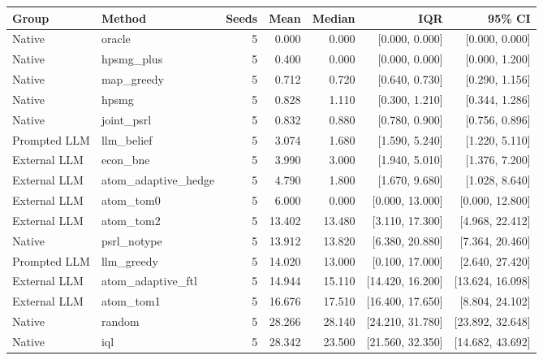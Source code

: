 \begin{tabular}{llrrrrr}
\toprule
Group & Method & Seeds & Mean & Median & IQR & 95\% CI \\
\midrule
Native & oracle & 5 & 0.000 & 0.000 & [0.000, 0.000] & [0.000, 0.000] \\
Native & hpsmg\_plus & 5 & 0.400 & 0.000 & [0.000, 0.000] & [0.000, 1.200] \\
Native & map\_greedy & 5 & 0.712 & 0.720 & [0.640, 0.730] & [0.290, 1.156] \\
Native & hpsmg & 5 & 0.828 & 1.110 & [0.300, 1.210] & [0.344, 1.286] \\
Native & joint\_psrl & 5 & 0.832 & 0.880 & [0.780, 0.900] & [0.756, 0.896] \\
Prompted LLM & llm\_belief & 5 & 3.074 & 1.680 & [1.590, 5.240] & [1.220, 5.110] \\
External LLM & econ\_bne & 5 & 3.990 & 3.000 & [1.940, 5.010] & [1.376, 7.200] \\
External LLM & atom\_adaptive\_hedge & 5 & 4.790 & 1.800 & [1.670, 9.680] & [1.028, 8.640] \\
External LLM & atom\_tom0 & 5 & 6.000 & 0.000 & [0.000, 13.000] & [0.000, 12.800] \\
External LLM & atom\_tom2 & 5 & 13.402 & 13.480 & [3.110, 17.300] & [4.968, 22.412] \\
Native & psrl\_notype & 5 & 13.912 & 13.820 & [6.380, 20.880] & [7.364, 20.460] \\
Prompted LLM & llm\_greedy & 5 & 14.020 & 13.000 & [0.100, 17.000] & [2.640, 27.420] \\
External LLM & atom\_adaptive\_ftl & 5 & 14.944 & 15.110 & [14.420, 16.200] & [13.624, 16.098] \\
External LLM & atom\_tom1 & 5 & 16.676 & 17.510 & [16.400, 17.650] & [8.804, 24.102] \\
Native & random & 5 & 28.266 & 28.140 & [24.210, 31.780] & [23.892, 32.648] \\
Native & iql & 5 & 28.342 & 23.500 & [21.560, 32.350] & [14.682, 43.692] \\
\bottomrule
\end{tabular}
